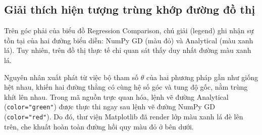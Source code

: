 \subsection{Giải thích hiện tượng trùng khớp đường đồ thị}
Trên góc phải của biểu đồ Regression Comparison, chú giải (legend) ghi nhận sự tồn tại của hai đường biểu diễn: NumPy GD (màu đỏ) và Analytical (màu xanh lá). Tuy nhiên, trên đồ thị thực tế chỉ quan sát thấy duy nhất đường màu xanh lá. 

Nguyên nhân xuất phát từ việc bộ tham số $\theta$ của hai phương pháp gần như giống hệt nhau, khiến hai đường thẳng có cùng hệ số góc và tung độ gốc, nằm trùng khít lên nhau. Trong mã nguồn trực quan hóa, lệnh vẽ đường Analytical (\texttt{color="green"}) được thực thi ngay sau lệnh vẽ đường NumPy GD (\texttt{color="red"}). Do đó, thư viện Matplotlib đã render lớp màu xanh lá đè lên trên, che khuất hoàn toàn đường hồi quy màu đỏ ở bên dưới.

